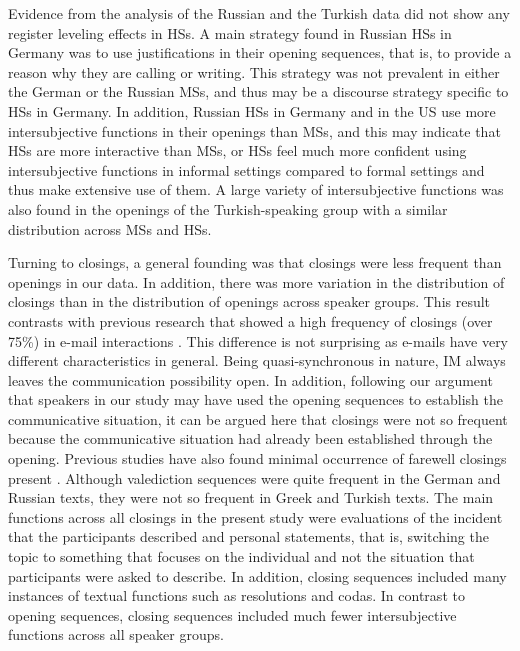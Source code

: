 \documentclass[output=paper,colorlinks,citecolor=brown]{langscibook}
\begin{document}
Evidence from the analysis of the Russian and the Turkish data did not show any register leveling effects in HSs. A main strategy found in Russian HSs in Germany was to use justifications in their opening sequences, that is, to provide a reason why they are calling or writing. This strategy was not prevalent in either the German or the Russian MSs, and thus may be a discourse strategy specific to HSs in Germany. In addition, Russian HSs in Germany and in the US use more intersubjective functions in their openings than MSs, and this may indicate that HSs are more interactive than MSs, or HSs feel much more confident using intersubjective functions in informal settings compared to formal settings and thus make extensive use of them. A large variety of intersubjective functions was also found in the openings of the Turkish-speaking group with a similar distribution across MSs and HSs. 

Turning to closings, a general founding was that closings were less frequent than openings in our data. In addition, there was more variation in the distribution of closings than in the distribution of openings across speaker groups. This result contrasts with previous research that showed a high frequency of closings (over 75\%) in e-mail interactions \parencite{bou-franch_openings_2011}. This difference is not surprising as e-mails have very different characteristics in general. Being quasi-synchronous in nature, IM always leaves the communication possibility open. In addition, following our argument that speakers in our study may have used the opening sequences to establish the communicative situation, it can be argued here that closings were not so frequent because the communicative situation had already been established through the opening. Previous studies have also found minimal occurrence of farewell closings present \parencite{herring_two_1996, waldvogel_features_2002}. Although valediction sequences were quite frequent in the German and Russian texts, they were not so frequent in Greek and Turkish texts. The main functions across all closings in the present study were evaluations of the incident that the participants described and personal statements, that is, switching the topic to something that focuses on the individual and not the situation that participants were asked to describe. In addition, closing sequences included many instances of textual functions such as resolutions and codas. In contrast to opening sequences, closing sequences included much fewer intersubjective functions across all speaker groups.
\end{document}
